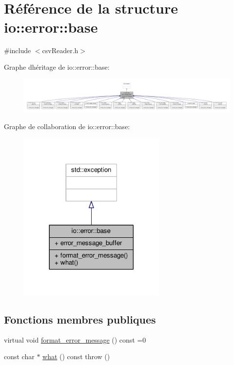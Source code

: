 \hypertarget{structio_1_1error_1_1base}{}\section{Référence de la structure io\+:\+:error\+:\+:base}
\label{structio_1_1error_1_1base}


{\ttfamily \#include $<$csv\+Reader.\+h$>$}



Graphe d\textquotesingle{}héritage de io\+:\+:error\+:\+:base\+:\nopagebreak
\begin{figure}[H]
\begin{center}
\leavevmode
\includegraphics[width=350pt]{structio_1_1error_1_1base__inherit__graph}
\end{center}
\end{figure}


Graphe de collaboration de io\+:\+:error\+:\+:base\+:\nopagebreak
\begin{figure}[H]
\begin{center}
\leavevmode
\includegraphics[width=209pt]{structio_1_1error_1_1base__coll__graph}
\end{center}
\end{figure}
\subsection*{Fonctions membres publiques}
\begin{DoxyCompactItemize}
\item 
virtual void \hyperlink{structio_1_1error_1_1base_a7d9ff6a31b716a24f056cf8a3e15191d}{format\+\_\+error\+\_\+message} () const =0
\item 
const char $\ast$ \hyperlink{structio_1_1error_1_1base_a35483dfbe91cea45cfa7c5613e83e5ef}{what} () const  throw ()
\end{DoxyCompactItemize}
